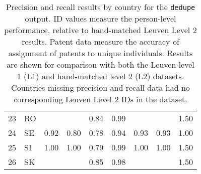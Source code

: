 \begin{table}[ht]
{\begin{tabular}{rlrrrrrrr}
  23 & RO &  &  & 0.84 & 0.99 &  &  & 1.50 \\ 
  24 & SE & 0.92 & 0.80 & 0.78 & 0.94 & 0.93 & 0.93 & 1.00 \\ 
  25 & SI & 1.00 & 1.00 & 0.79 & 0.99 & 1.00 & 1.00 & 1.50 \\ 
  26 & SK &  &  & 0.85 & 0.98 &  &  & 1.50 \\ 
   \hline
\end{tabular}
}
\caption{Precision and recall results by country for the \texttt{dedupe} output. ID values measure the person-level performance, relative to hand-matched Leuven Level 2 results. Patent data measure the accuracy of assignment of patents to unique individuals. Results are shown for comparison with both the Leuven level 1 (L1) and hand-matched level 2 (L2) datasets. Countries missing precision and recall data had no corresponding Leuven Level 2 IDs in the dataset.} 
\label{tab:pr}
\end{table}
